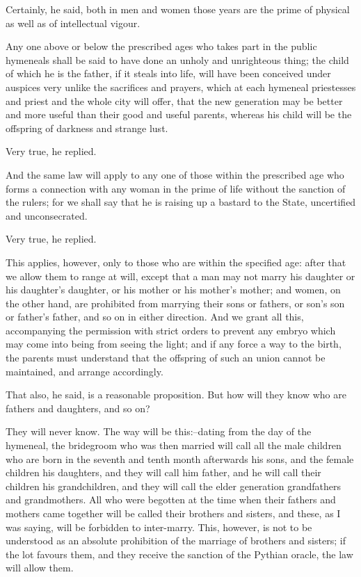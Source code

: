 Certainly, he said, both in men and women those years are the prime of
physical as well as of intellectual vigour.

Any one above or below the prescribed ages who takes part in the public
hymeneals shall be said to have done an unholy and unrighteous thing;
the child of which he is the father, if it steals into life, will have
been conceived under auspices very unlike the sacrifices and prayers,
which at each hymeneal priestesses and priest and the whole city will
offer, that the new generation may be better and more useful than their
good and useful parents, whereas his child will be the offspring of
darkness and strange lust.

Very true, he replied.

And the same law will apply to any one of those within the prescribed
age who forms a connection with any woman in the prime of life without
the sanction of the rulers; for we shall say that he is raising up a
bastard to the State, uncertified and unconsecrated.

Very true, he replied.

This applies, however, only to those who are within the specified age:
after that we allow them to range at will, except that a man may not
marry his daughter or his daughter's daughter, or his mother or his
mother's mother; and women, on the other hand, are prohibited from
marrying their sons or fathers, or son's son or father's father, and
so on in either direction. And we grant all this, accompanying the
permission with strict orders to prevent any embryo which may come into
being from seeing the light; and if any force a way to the birth, the
parents must understand that the offspring of such an union cannot be
maintained, and arrange accordingly.

That also, he said, is a reasonable proposition. But how will they know
who are fathers and daughters, and so on?

They will never know. The way will be this:--dating from the day of the
hymeneal, the bridegroom who was then married will call all the male
children who are born in the seventh and tenth month afterwards his
sons, and the female children his daughters, and they will call him
father, and he will call their children his grandchildren, and they will
call the elder generation grandfathers and grandmothers. All who were
begotten at the time when their fathers and mothers came together will
be called their brothers and sisters, and these, as I was saying, will
be forbidden to inter-marry. This, however, is not to be understood as
an absolute prohibition of the marriage of brothers and sisters; if the
lot favours them, and they receive the sanction of the Pythian oracle,
the law will allow them.

